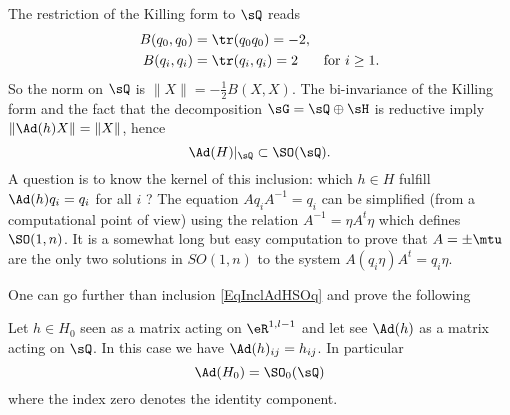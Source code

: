 The restriction of the Killing form to $\sQ$ reads
\begin{subequations}
\begin{align}
	B(q_0,q_0)&=\tr(q_0q_0)=-2,\\
	B(q_{i},q_{i})&=\tr(q_{i},q_{i})=2&\textrm{for $i\geq 1$}.
\end{align}
\end{subequations}
So the norm on $\sQ$ is $\| X \|=-\frac{ 1 }{2}B(X,X)$. The bi-invariance of the Killing form and the fact that the decomposition $\sG=\sQ\oplus\sH$ is reductive  imply $\| \Ad(h)X \|=\| X \|$, hence
\begin{equation}  \label{EqInclAdHSOq}
  \Ad(H)|_{\sQ}\subset\SO(\sQ).
\end{equation} 
A question is to know the kernel of this inclusion: which $h\in H$ fulfill $\Ad(h)q_i=q_i$ for all $i$ ? The equation $Aq_iA^{-1}=q_i$ can be simplified (from a computational point of view) using the relation $A^{-1}=\eta A^t\eta$ which defines $\SO(1,n)$. It is a somewhat long but easy computation to prove that $A=\pm\mtu$ are the only two solutions in $SO(1,n)$ to the system $A(q_i\eta)A^t=q_i\eta$.

One can go further than inclusion \eqref{EqInclAdHSOq} and prove the following
\begin{proposition}		
 Let $h\in H_0$ seen as a matrix acting on $\eR^{1,l-1}$ and let see $\Ad(h)$ as a matrix acting on $\sQ$. In this case we have $\Ad(h)_{ij}=h_{ij}$. In particular
\begin{equation}
   \Ad(H_0)=\SO_0(\sQ)
\end{equation} 
where the index zero denotes the identity component.
\label{PropSOADHequal}
\end{proposition}

